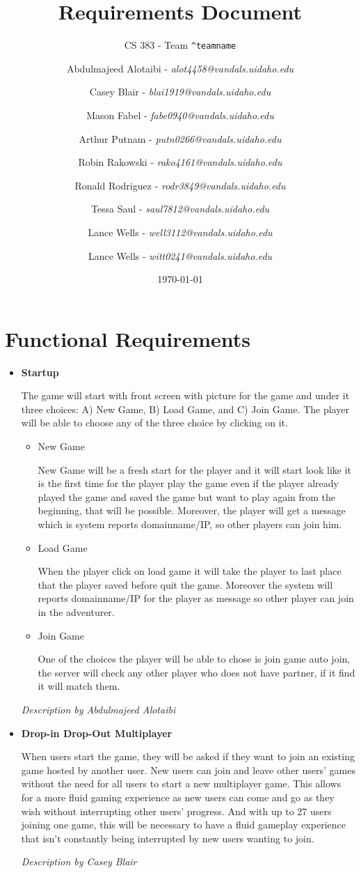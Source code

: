 \documentclass[12pt]{article}
\title{Requirements Document}
\subtitle{CS 383 - Team \texttt{\textasciicircum teamname}}
\date{\today}
\author{
Abdulmajeed Alotaibi - \textit{alot4458@vandals.uidaho.edu} \\
\and Casey Blair - \textit{blai1919@vandals.uidaho.edu} \\
\and Mason Fabel - \textit{fabe0940@vandals.uidaho.edu} \\
\and Arthur Putnam - \textit{putn0266@vandals.uidaho.edu} \\
\and Robin Rakowski - \textit{rako4161@vandals.uidaho.edu} \\
\and Ronald Rodriguez - \textit{rodr3849@vandals.uidaho.edu} \\
\and Tessa Saul - \textit{saul7812@vandals.uidaho.edu} \\
\and Lance Wells - \textit{well3112@vandals.uidaho.edu} \\
\and Lance Wells - \textit{witt0241@vandals.uidaho.edu} \\
}
\begin{document}
\maketitle

\section{Functional Requirements}
\begin{itemize}
	\item \textbf{Startup}
	
	The game will start with front screen with picture for the game and under
	it three choices: A) New Game, B) Load Game, and C) Join Game. The player
	will be able to choose any of the three choice by clicking on it.

	\begin{itemize}
	\item New Game

	New Game will be a fresh start for the player and it will start look like
	it is the first time for the player play the game even if the player
	already played the game and saved the game but want to play again from the
	beginning, that will be possible. Moreover, the player will get a message
	which is system reports domainname/IP, so other players can join him.

	\item Load Game

	When the player click on load game it will take the player to last place
	that the player saved before quit the game. Moreover the system will
	reports domainname/IP for the player as message so other player can join in
	the adventurer.

	\item Join Game

	One of the choices the player will be able to chose is join game auto join,
	the server will check any other player who does not have partner, if it
	find it will match them.
	\end{itemize}
	
	\emph{Description by Abdulmajeed Alotaibi}
	
	\item \textbf{Drop-in Drop-Out Multiplayer}
	
	 When users start the game, they will be asked if they want to join an existing game hosted by another user. New users can join and leave other users’ games without the need for all users to start a new multiplayer game. This allows
for a more fluid gaming experience as new users can come and go as they wish without interrupting other users’ progress. And with up to 27 users joining one game, this will be necessary to have a fluid gameplay experience that isn’t constantly being interrupted by new users wanting to
join.

\emph{Description by Casey Blair}
\end{itemize}
\end{document}
